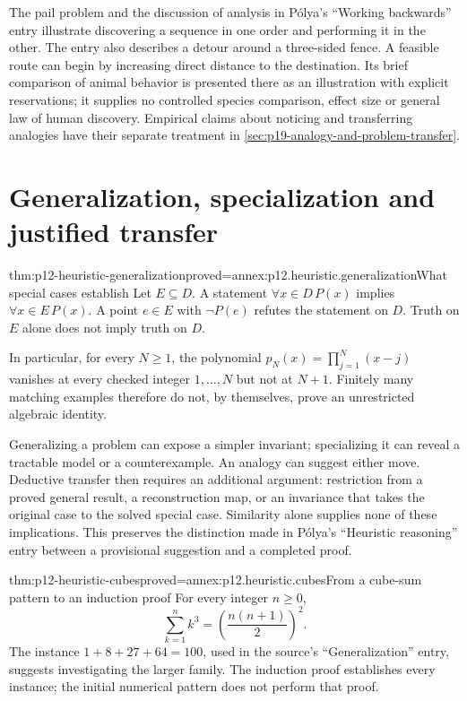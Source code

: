 The pail problem and the discussion of analysis in P\'olya's
``Working backwards'' entry illustrate discovering a sequence in
one order and performing it in the other. The entry also describes
a detour around a three-sided fence. A feasible route can begin
by increasing direct distance to the destination. Its brief comparison
of animal behavior is presented there as an illustration with explicit
reservations; it supplies no controlled species comparison, effect
size or general law of human discovery. Empirical claims about
noticing and transferring analogies have their separate treatment
in \cref{sec:p19-analogy-and-problem-transfer}.

\section{Generalization, specialization and justified transfer}

\begin{hbtheorem}{thm:p12-heuristic-generalization}{proved=annex:p12.heuristic.generalization}{What special cases establish}
Let \(E\subseteq D\). A statement \(\forall x\in D\,P(x)\)
implies \(\forall x\in E\,P(x)\). A point \(e\in E\)
with \(\neg P(e)\) refutes the statement on \(D\).
Truth on \(E\) alone does not imply truth on \(D\).

In particular, for every \(N\ge1\), the polynomial
\(p_N(x)=\prod_{j=1}^{N}(x-j)\) vanishes at every checked
integer \(1,\ldots,N\) but not at \(N+1\).
Finitely many matching examples therefore do not, by themselves,
prove an unrestricted algebraic identity.
\end{hbtheorem}

Generalizing a problem can expose a simpler invariant; specializing it
can reveal a tractable model or a counterexample. An analogy can suggest
either move. Deductive transfer then requires an additional argument:
restriction from a proved general result, a reconstruction map, or an
invariance that takes the original case to the solved special case.
Similarity alone supplies none of these implications. This preserves
the distinction made in P\'olya's ``Heuristic reasoning'' entry between
a provisional suggestion and a completed proof.

\begin{hbtheorem}{thm:p12-heuristic-cubes}{proved=annex:p12.heuristic.cubes}{From a cube-sum pattern to an induction proof}
For every integer \(n\ge0\),
\[
                  \sum_{k=1}^{n}k^3=
                        \left(\frac{n(n+1)}2\right)^2.
\]
The instance \(1+8+27+64=100\), used in the source's
``Generalization'' entry, suggests investigating the larger family.
The induction proof establishes every instance; the initial numerical
pattern does not perform that proof.
\end{hbtheorem}

